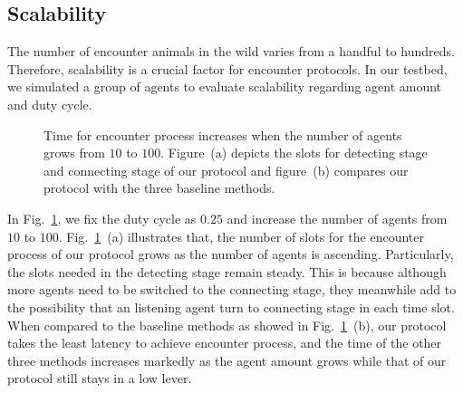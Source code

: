 \subsection{Scalability}



The number of encounter animals in the wild varies from a handful to hundreds. 
Therefore, scalability is a crucial factor for encounter protocols. 
In our testbed, we simulated a group of agents to evaluate scalability 
regarding agent amount and duty cycle.

\begin{figure}[!h]
    \centering
    \hspace{0.01in}
    \caption{Time for encounter process increases when the number of agents grows from $10$ to $100$.
    Figure~(a) depicts the slots for detecting stage and connecting stage of our protocol and figure~(b)
    compares our protocol with the three baseline methods.}
    \label{fig_num}
\end{figure}

In Fig.~\ref{fig_num}, we fix the duty cycle as $0.25$ and 
increase the number of agents from $10$ to $100$.
Fig.~\ref{fig_num}~(a) illustrates that,
the number of slots for the encounter process 
of our protocol grows as the number of agents is ascending. Particularly,
the slots needed in the detecting stage remain steady.
This is because although more agents need to be switched to the connecting stage,
they meanwhile add to the possibility
that an listening agent turn to connecting stage in each time slot.
When compared to the baseline methods as showed in Fig.~\ref{fig_num}~(b), our protocol takes the least latency
to achieve encounter process, and the time of the other three methods increases
markedly as the agent amount grows while that of our protocol still stays in a low lever.

